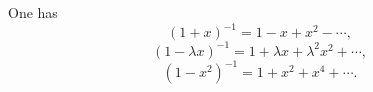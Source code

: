 

\setcounter{section}{2}
\setcounter{subsection}{2}
\setcounter{dfn}{7}

\begin{exl}
One has
\[
(1 + x)^{-1} = 1 - x + x^2 - \cdots,
\]
\[
(1 - \lambda x)^{-1} = 1 + \lambda x + \lambda^2 x^2 + \cdots,
\]
\[
(1 - x^2)^{-1} = 1 + x^2 + x^4 + \cdots.
\]
\end{exl}

